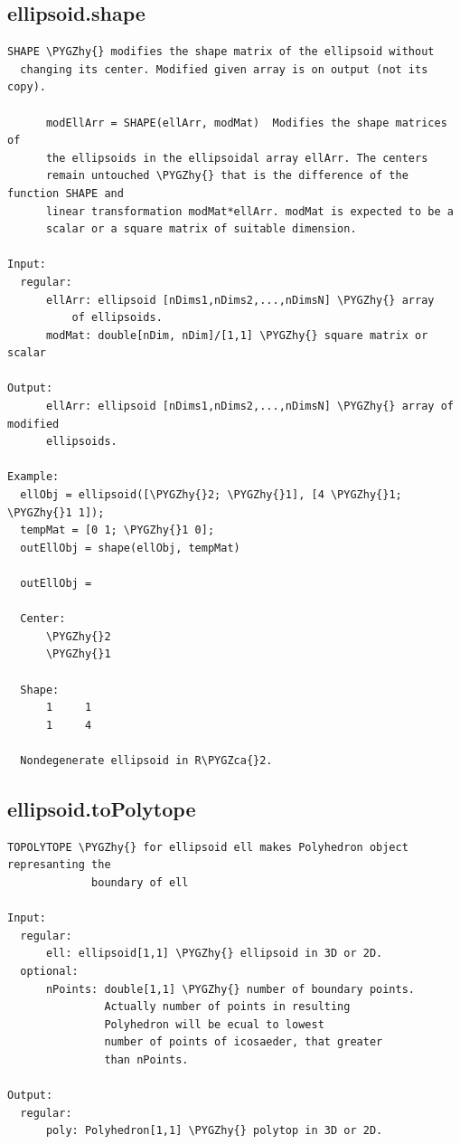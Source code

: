 \documentclass[letterpaper,10pt,english]{sphinxmanual}
\def\PYGZca{\char`\^}
\def\PYGZhy{\char`\-}
\begin{document}
\subsection{ellipsoid.shape}
\label{chap_functions:ellipsoid-shape}
\begin{Verbatim}[commandchars=\\\{\}]
SHAPE \PYGZhy{} modifies the shape matrix of the ellipsoid without
  changing its center. Modified given array is on output (not its copy).

      modEllArr = SHAPE(ellArr, modMat)  Modifies the shape matrices of
      the ellipsoids in the ellipsoidal array ellArr. The centers
      remain untouched \PYGZhy{} that is the difference of the function SHAPE and
      linear transformation modMat*ellArr. modMat is expected to be a
      scalar or a square matrix of suitable dimension.

Input:
  regular:
      ellArr: ellipsoid [nDims1,nDims2,...,nDimsN] \PYGZhy{} array
          of ellipsoids.
      modMat: double[nDim, nDim]/[1,1] \PYGZhy{} square matrix or scalar

Output:
      ellArr: ellipsoid [nDims1,nDims2,...,nDimsN] \PYGZhy{} array of modified
      ellipsoids.

Example:
  ellObj = ellipsoid([\PYGZhy{}2; \PYGZhy{}1], [4 \PYGZhy{}1; \PYGZhy{}1 1]);
  tempMat = [0 1; \PYGZhy{}1 0];
  outEllObj = shape(ellObj, tempMat)

  outEllObj =

  Center:
      \PYGZhy{}2
      \PYGZhy{}1

  Shape:
      1     1
      1     4

  Nondegenerate ellipsoid in R\PYGZca{}2.
\end{Verbatim}


\subsection{ellipsoid.toPolytope}
\label{chap_functions:ellipsoid-topolytope}
\begin{Verbatim}[commandchars=\\\{\}]
TOPOLYTOPE \PYGZhy{} for ellipsoid ell makes Polyhedron object represanting the
             boundary of ell

Input:
  regular:
      ell: ellipsoid[1,1] \PYGZhy{} ellipsoid in 3D or 2D.
  optional:
      nPoints: double[1,1] \PYGZhy{} number of boundary points.
               Actually number of points in resulting
               Polyhedron will be ecual to lowest
               number of points of icosaeder, that greater
               than nPoints.

Output:
  regular:
      poly: Polyhedron[1,1] \PYGZhy{} polytop in 3D or 2D.
\end{Verbatim}
\end{document}
